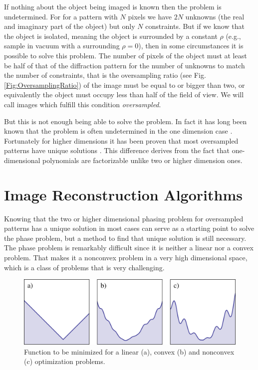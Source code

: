 If nothing about the object being imaged is known then the problem is
undetermined. For for a pattern with $N$ pixels we have $2N$ unknowns (the real and
imaginary part of the object) but only $N$ constraints. But if we know that the object is isolated, meaning the
object is surrounded by a constant $\rho$ (e.g., sample in vacuum with a
surrounding $\rho = 0$), then in some circumstances it is possible to solve this
problem. The number of pixels of the object must at least be half of that of the
diffraction pattern for the number of unknowns to match the number of
constraints, that is the oversampling ratio (see
Fig. \ref{Fig:OversamplingRatio}) of the image must be equal to or bigger than
two, or equivalently the object must occupy less than half of the field of
view. We will call images which fulfill this condition {\em oversampled}.

But this is not enough being able to solve the problem. In fact it
has long been known that the problem is often undetermined in the one dimension case
\cite{Walther1963Question}. Fortunately for higher dimensions it has
been proven that most oversampled patterns have unique solutions
\cite{Bruck1979Ambiguity}. This difference derives from the fact that one-dimensional
polynomials are factorizable unlike two or higher dimension ones.

\section{Image Reconstruction Algorithms}

Knowing that the two or higher dimensional phasing problem for oversampled
patterns has a unique solution in most cases can serve as a starting point to
solve the phase problem, but a method to find that unique solution is still
necessary. The phase problem is remarkably difficult since it is neither a
linear nor a convex problem. That makes it a nonconvex problem in a very high
dimensional space, which is a class of problems that is very challenging.

\begin{figure}[h]
  \centering
  \includegraphics[width=1 \columnwidth]{Image_Reconstruction/convexity.png}
  \caption{Function to be minimized for a linear (a), convex (b) and nonconvex
    (c) optimization problems.}
  \label{Fig:Convexity}
\end{figure}

